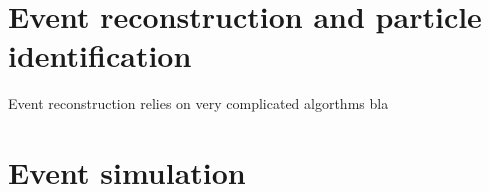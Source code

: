 \chapter{Event reconstruction and particle identification}

Event reconstruction relies on very complicated algorthms bla


\FloatBarrier
\chapter{Event simulation}
